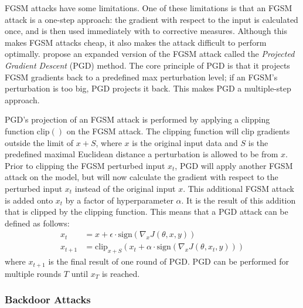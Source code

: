 \documentclass[11pt]{article}
\begin{document}
FGSM attacks have some limitations.
One of these limitations is that an FGSM attack is a one-step approach: the gradient with respect to the input is calculated once, and is then used immediately with to corrective measures.
Although this makes FGSM attacks cheap, it also makes the attack difficult to perform optimally.
\citet{madry2018towards} propose an expanded version of the FGSM attack called the \textit{Projected Gradient Descent} (PGD) method.
The core principle of PGD is that it projects FGSM gradients back to a predefined max perturbation level; if an FGSM's perturbation is too big, PGD projects it back.
This makes PGD a multiple-step approach.

PGD's projection of an FGSM attack is performed by applying a clipping function $\text{clip}()$ on the FGSM attack.
The clipping function will clip gradients outside the limit of $x + S$, where $x$ is the original input data and $S$ is the predefined maximal Euclidean distance a perturbation is allowed to be from $x$.
Prior to clipping the FGSM perturbed input $x_t$, PGD will apply another FGSM attack on the model, but will now calculate the gradient with respect to the perturbed input $x_t$ instead of the original input $x$.
This additional FGSM attack is added onto $x_t$ by a factor of hyperparameter $\alpha$.
It is the result of this addition that is clipped by the clipping function.
This means that a PGD attack can be defined as follows:
\begin{align*}
  x_t &= x + \epsilon \cdot \text{sign}(\nabla_x J(\theta, x, y)) \\
  x_{t+1} &= \text{clip}_{x + S}(x_t + \alpha \cdot \text{sign}(\nabla_x J(\theta, x_t, y)))
\end{align*}
where $x_{t+1}$ is the final result of one round of PGD.
PGD can be performed for multiple rounds $T$ until $x_T$ is reached. 

\subsubsection{Backdoor Attacks}
\citet{gu2019badnets} %

\citet{liu2018trojaning} %

\citet{stefanos2022ultrasonic} %
\end{document}
